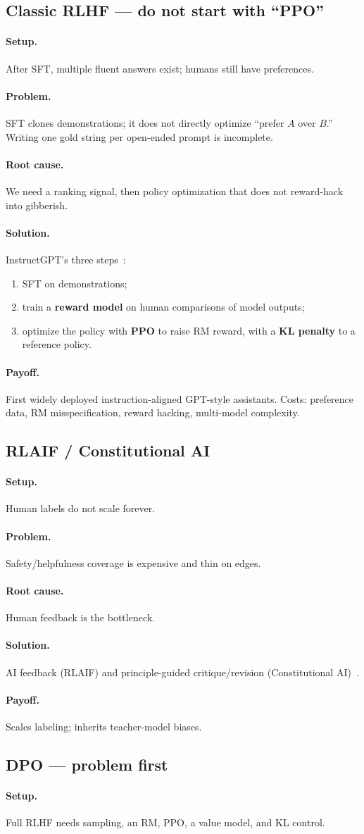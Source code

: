 \documentclass[11pt,a4paper]{article}
\newcommand{\layer}[1]{\paragraph{#1.}}
\newcommand{\setup}{\layer{Setup}}
\newcommand{\problem}{\layer{Problem}}
\newcommand{\rootcause}{\layer{Root cause}}
\newcommand{\solution}{\layer{Solution}}
\newcommand{\payoff}{\layer{Payoff}}
\begin{document}
\subsection{Classic RLHF --- do not start with ``PPO''}
\label{sec:rlhf}

\setup
After SFT, multiple fluent answers exist; humans still have preferences.

\problem
SFT clones demonstrations; it does not directly optimize ``prefer \(A\) over \(B\).''
Writing one gold string per open-ended prompt is incomplete.

\rootcause
We need a ranking signal, then policy optimization that does not reward-hack into gibberish.

\solution
InstructGPT's three steps~\cite{ouyang2022instructgpt,openai2022instruct}:
\begin{enumerate}[leftmargin=*]
  \item SFT on demonstrations;
  \item train a \textbf{reward model} on human comparisons of model outputs;
  \item optimize the policy with \textbf{PPO} to raise RM reward, with a \textbf{KL penalty} to a reference policy.
\end{enumerate}

\payoff
First widely deployed instruction-aligned GPT-style assistants.
Costs: preference data, RM misspecification, reward hacking, multi-model complexity.

\subsection{RLAIF / Constitutional AI}
\label{sec:rlaif}

\setup
Human labels do not scale forever.

\problem
Safety/helpfulness coverage is expensive and thin on edges.

\rootcause
Human feedback is the bottleneck.

\solution
AI feedback (RLAIF) and principle-guided critique/revision (Constitutional AI)~\cite{bai2022constitutional}.

\payoff
Scales labeling; inherits teacher-model biases.

\subsection{DPO --- problem first}
\label{sec:dpo}

\setup
Full RLHF needs sampling, an RM, PPO, a value model, and KL control.
\end{document}
